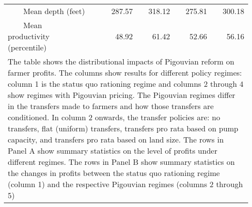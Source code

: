 \begin{table}[!ht]
\begin{tabular}{lrrrrr}
		~~~~Mean depth (feet)&  &287.57&318.12&275.81&300.18\\
		~~~~Mean productivity (percentile)&  &48.92&61.42&52.66&56.16\\
		\bottomrule
\multicolumn{6}{p{0.80\hsize}}{\footnotesize The table shows the distributional impacts of Pigouvian reform on farmer profits. The columns show results for different policy regimes: column 1 is the status quo rationing regime and columns 2 through 4 show regimes with Pigouvian pricing. The Pigouvian regimes differ in the transfers made to farmers and how those transfers are conditioned. In column 2 onwards, the transfer policies are: no transfers, flat (uniform) transfers, transfers pro rata based on pump capacity, and transfers pro rata based on land size. The rows in Panel A show summary statistics on the level of profits under different regimes. The rows in Panel B show summary statistics on the changes in profits between the status quo rationing regime (column 1) and the respective Pigouvian regimes (columns 2 through 5)} \\
	\end{tabular}
\end{table}
